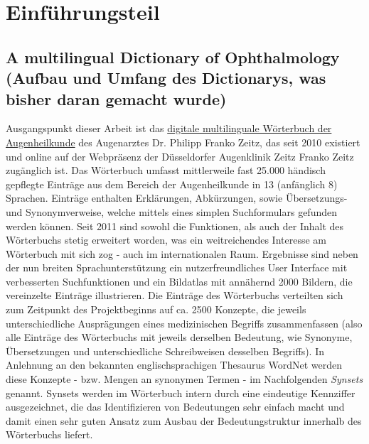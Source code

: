 \documentclass[pagesize,DIV=calc,12pt,draft]{scrreprt}
\begin{document}

\chapter{Einführungsteil}

\section{A multilingual Dictionary of Ophthalmology (Aufbau und Umfang des Dictionarys, was bisher daran gemacht wurde)}

Ausgangspunkt dieser Arbeit ist das \href{http://www.zeitzfrankozeitz.de/index.php/fachwoerterbuch.html}{digitale multilinguale Wörterbuch der Augenheilkunde} des Augenarztes Dr. 
Philipp Franko Zeitz, das seit 2010 existiert und online auf der Webpräsenz der Düsseldorfer Augenklinik Zeitz Franko Zeitz zugänglich ist.  Das Wörterbuch umfasst mittlerweile fast 25.000 händisch gepflegte Einträge aus dem Bereich der Augenheilkunde in 13 (anfänglich 8) Sprachen. 
Einträge enthalten Erklärungen, Abkürzungen, sowie Übersetzungs- und Synonymverweise, welche mittels eines simplen Suchformulars gefunden werden können. 
Seit 2011 sind sowohl die Funktionen, als auch der Inhalt des Wörterbuchs stetig erweitert worden, was ein weitreichendes Interesse am Wörterbuch mit sich zog - auch im internationalen Raum. 
Ergebnisse sind neben der nun breiten Sprachunterstützung ein nutzerfreundliches User Interface mit verbesserten Suchfunktionen und ein Bildatlas mit annähernd 2000 Bildern, die vereinzelte Einträge illustrieren.  Die Einträge des Wörterbuchs verteilten sich zum Zeitpunkt des Projektbeginns auf ca. 2500 Konzepte, die jeweils unterschiedliche Ausprägungen eines medizinischen Begriffs zusammenfassen (also alle Einträge des Wörterbuchs mit jeweils derselben Bedeutung, wie Synonyme, Übersetzungen und unterschiedliche Schreibweisen desselben Begriffs). 
In Anlehnung an den bekannten englischsprachigen Thesaurus WordNet werden diese Konzepte - bzw. 
Mengen an synonymen Termen - im Nachfolgenden \emph{Synsets} genannt. 
Synsets werden im Wörterbuch intern durch eine eindeutige Kennziffer ausgezeichnet, die das Identifizieren von Bedeutungen sehr einfach macht und damit einen sehr guten Ansatz zum Ausbau der Bedeutungstruktur innerhalb des Wörterbuchs liefert.
\end{document}
